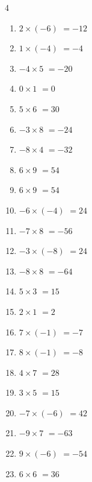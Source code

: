 \begin{multicols}{4}
\begin{enumerate}
  \item $2\times (-6)$
        $=-12$

  \item $1\times (-4)$
        $=-4$

  \item $-4\times 5$
        $=-20$

  \item $0\times 1$
        $=0$

  \item $5\times 6$
        $=30$

  \item $-3\times 8$
        $=-24$

  \item $-8\times 4$
        $=-32$

  \item $6\times 9$
        $=54$

  \item $6\times 9$
        $=54$

  \item $-6\times (-4)$
        $=24$

  \item $-7\times 8$
        $=-56$

  \item $-3\times (-8)$
        $=24$

  \item $-8\times 8$
        $=-64$

  \item $5\times 3$
        $=15$

  \item $2\times 1$
        $=2$

  \item $7\times (-1)$
        $=-7$

  \item $8\times (-1)$
        $=-8$

  \item $4\times 7$
        $=28$

  \item $3\times 5$
        $=15$

  \item $-7\times (-6)$
        $=42$

  \item $-9\times 7$
        $=-63$

  \item $9\times (-6)$
        $=-54$

  \item $6\times 6$
        $=36$


\end{enumerate}
\end{multicols}
